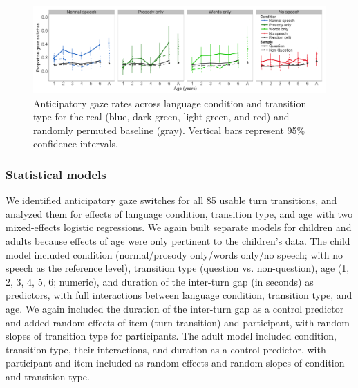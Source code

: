 \documentclass[authoryear, 12pt]{elsarticle}
\begin{document}
\begin{figure}[h]
\begin{center}
\includegraphics[width=\textwidth]{figures/E2-samples-by-lang-groups-trans-types.png}
\end{center}
\caption{Anticipatory gaze rates across language condition and transition type for the real (blue, dark green, light green, and red) and randomly permuted baseline (gray). Vertical bars represent 95\% confidence intervals.} 
\label{fig:E2-randvsreal}
\end{figure}

\subsubsection{Statistical models}
\label{sec:models2}

We identified anticipatory gaze switches for all 85 usable turn transitions, and analyzed them for effects of language condition, transition type, and age with two mixed-effects logistic regressions. We again built separate models for children and adults because effects of age were only pertinent to the children's data. The child model included condition (normal/prosody only/words only/no speech; with no speech as the reference level), transition type (question vs. non-question), age (1, 2, 3, 4, 5, 6; numeric), and duration of the inter-turn gap (in seconds) as predictors, with full interactions between language condition, transition type, and age.  We again included the duration of the inter-turn gap as a control predictor and added random effects of item (turn transition) and participant, with random slopes of transition type for participants. The adult model included condition, transition type, their interactions, and duration as a control predictor, with participant and item included as random effects and random slopes of condition and transition type.
\end{document}

